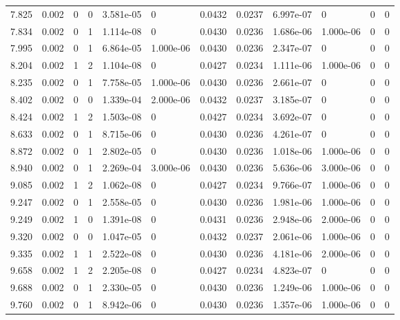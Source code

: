 \documentclass[preview]{standalone}
\begin{document}
{{{\begin{tabular}{L{1.2cm}C{1.2cm} C{0.3cm}C{0.5cm} C{1.4cm}C{1.4cm} C{1.4cm}C{1.4cm} C{1.6cm}C{1.6cm} C{1.6cm}C{1.6cm}}
  7.825  &  0.002  & 0     &  0 &  3.581e-05  & 0  &  0.0432&   0.0237& 6.997e-07 & 0   &  0 & 0  \\ 
  7.834  &  0.002  & 0     &  1 &  1.114e-08  & 0  &  0.0430&   0.0236& 1.686e-06 & 1.000e-06   &  0 & 0  \\ 
  7.995  &  0.002  & 0     &  1 &  6.864e-05  & 1.000e-06  &  0.0430&   0.0236& 2.347e-07 & 0   &  0 & 0  \\ 
  8.204  &  0.002  & 1     &  2 &  1.104e-08  & 0  &  0.0427&   0.0234& 1.111e-06 & 1.000e-06   &  0 & 0  \\ 
  8.235  &  0.002  & 0     &  1 &  7.758e-05  & 1.000e-06  &  0.0430&   0.0236& 2.661e-07 & 0   &  0 & 0  \\ 
  8.402  &  0.002  & 0     &  0 &  1.339e-04  & 2.000e-06  &  0.0432&   0.0237& 3.185e-07 & 0   &  0 & 0  \\ 
  8.424  &  0.002  & 1     &  2 &  1.503e-08  & 0  &  0.0427&   0.0234& 3.692e-07 & 0   &  0 & 0  \\ 
  8.633  &  0.002  & 0     &  1 &  8.715e-06  & 0  &  0.0430&   0.0236& 4.261e-07 & 0   &  0 & 0  \\ 
  8.872  &  0.002  & 0     &  1 &  2.802e-05  & 0  &  0.0430&   0.0236& 1.018e-06 & 1.000e-06   &  0 & 0  \\ 
  8.940  &  0.002  & 0     &  1 &  2.269e-04  & 3.000e-06  &  0.0430&   0.0236& 5.636e-06 & 3.000e-06   &  0 & 0  \\ 
  9.085  &  0.002  & 1     &  2 &  1.062e-08  & 0  &  0.0427&   0.0234& 9.766e-07 & 1.000e-06   &  0 & 0  \\ 
  9.247  &  0.002  & 0     &  1 &  2.558e-05  & 0  &  0.0430&   0.0236& 1.981e-06 & 1.000e-06   &  0 & 0  \\ 
  9.249  &  0.002  & 1     &  0 &  1.391e-08  & 0  &  0.0431&   0.0236& 2.948e-06 & 2.000e-06   &  0 & 0  \\ 
  9.320  &  0.002  & 0     &  0 &  1.047e-05  & 0  &  0.0432&   0.0237& 2.061e-06 & 1.000e-06   &  0 & 0  \\ 
  9.335  &  0.002  & 1     &  1 &  2.522e-08  & 0  &  0.0430&   0.0236& 4.181e-06 & 2.000e-06   &  0 & 0  \\ 
  9.658  &  0.002  & 1     &  2 &  2.205e-08  & 0  &  0.0427&   0.0234& 4.823e-07 & 0   &  0 & 0  \\ 
  9.688  &  0.002  & 0     &  1 &  2.330e-05  & 0  &  0.0430&   0.0236& 1.249e-06 & 1.000e-06   &  0 & 0  \\ 
  9.760  &  0.002  & 0     &  1 &  8.942e-06  & 0  &  0.0430&   0.0236& 1.357e-06 & 1.000e-06   &  0 & 0  \\ 

\end{tabular}}}}
\end{document}
